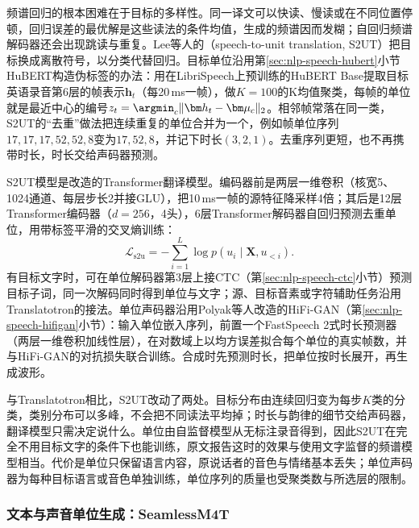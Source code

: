 频谱回归的根本困难在于目标的多样性。同一译文可以快读、慢读或在不同位置停顿，回归误差的最优解是这些读法的条件均值，生成的频谱因而发糊；自回归频谱解码器还会出现跳读与重复。Lee等人的（speech-to-unit translation, S2UT）把目标换成离散符号，以分类代替回归。目标单位沿用第\ref{sec:nlp-speech-hubert}小节HuBERT构造伪标签的办法：用在LibriSpeech上预训练的HuBERT Base提取目标英语录音第6层的帧表示$\bm h_t$（每20\,ms一帧），做$K=100$的K均值聚类，每帧的单位就是最近中心的编号$z_t=\argmin_{c}\lVert\bm h_t-\bm\mu_c\rVert_2$。相邻帧常落在同一类，S2UT的“去重”做法把连续重复的单位合并为一个，例如帧单位序列$17,17,17,52,52,8$变为$17,52,8$，并记下时长$(3,2,1)$。去重序列更短，也不再携带时长，时长交给声码器预测。

S2UT模型是改造的Transformer翻译模型。编码器前是两层一维卷积（核宽5、1024通道、每层步长2并接GLU），把10\,ms一帧的源特征降采样4倍；其后是12层Transformer编码器（$d=256$，4头），6层Transformer解码器自回归预测去重单位，用带标签平滑的交叉熵训练：
\begin{equation}
 \mathcal L_{\mathrm{s2u}}=-\sum_{i=1}^{L}\log p(u_i\mid\bm X,u_{<i}).
 \label{eq:nlp-speech-s2ut}
\end{equation}
有目标文字时，可在单位解码器第3层上接CTC（第\ref{sec:nlp-speech-ctc}小节）预测目标子词，同一次解码同时得到单位与文字；源、目标音素或字符辅助任务沿用Translatotron的接法。单位声码器沿用Polyak等人改造的HiFi-GAN（第\ref{sec:nlp-speech-hifigan}小节）：输入单位嵌入序列，前置一个FastSpeech 2式时长预测器（两层一维卷积加线性层），在对数域上以均方误差拟合每个单位的真实帧数，并与HiFi-GAN的对抗损失联合训练\cite{nlp-speech-polyak2021resynthesis}。合成时先预测时长，把单位按时长展开，再生成波形。

与Translatotron相比，S2UT改动了两处。目标分布由连续回归变为每步$K$类的分类，类别分布可以多峰，不会把不同读法平均掉；时长与韵律的细节交给声码器，翻译模型只需决定说什么。单位由自监督模型从无标注录音得到，因此S2UT在完全不用目标文字的条件下也能训练，原文报告这时的效果与使用文字监督的频谱模型相当。代价是单位只保留语言内容，原说话者的音色与情绪基本丢失；单位声码器为每种目标语言或音色单独训练，单位序列的质量也受聚类数与所选层的限制。

\subsubsection{文本与声音单位生成：SeamlessM4T}
\label{sec:nlp-speech-seamless}

